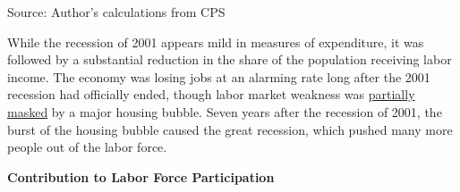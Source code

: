 \documentclass{report}
\newcommand{\barylab}[2]{yticklabel style={text width=#1, align=right, 
		style={black!70}, text height=#2},}
\newcommand{\bbar}[2]{extra #1 ticks = {{#2}}, extra #1 tick labels = ,
		extra #1 tick style = {grid=major, grid style={thick, black!25}},}
\newcommand{\barplotnogrid}{xbar=0pt, axis line style={draw=none},
	    yticklabel style={align=left, anchor=east},
      		xmajorticks=false, ymajorgrids=false,   
	    ytick=data, tickwidth=0pt, area legend, reverse legend,
	    nodes near coords, nodes near coords align={horizontal},}
\begin{document}
{{{{{{{{{\begin{minipage}{0.38\textwidth}
\hspace*{-4mm} 

\footnotesize{Source: Author's calculations from CPS}
\end{minipage} \hspace{4mm}
\begin{minipage}{0.34\textwidth}
\small 
\end{minipage}
\vspace{1mm}

\begin{minipage}{0.76\textwidth}
\small While the recession of 2001 appears mild in measures of expenditure, it was followed by a substantial reduction in the share of the population receiving labor income. The economy was losing jobs at an alarming rate long after the 2001 recession had officially ended, though labor market weakness was \href{https://www.aeaweb.org/articles?id=10.1257/jep.30.2.179}{partially masked} by a major housing bubble. Seven years after the recession of 2001, the burst of the housing bubble caused the great recession, which pushed many more people out of the labor force.
\end{minipage}

\vspace{1.5mm}

\begin{minipage}{0.3\textwidth}
\small  
\end{minipage} \hspace{7mm}
\begin{minipage}{0.42\textwidth}
\normalsize \textbf{Contribution to Labor Force Participation}


\end{minipage}}}}}}}}}}
\end{document}
